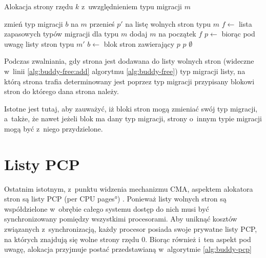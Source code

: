 \begin{algorithm}
\caption[Alokacja z~uwzględnieniem typu migracji.]{Alokacja strony
  rzędu $k$ z~uwzględnieniem typu migracji $m$}
\label{alg:buddy-fallback}
\begin{algorithmic}[1]
\State zmień typ migracji $b$ na $m$
    \State przenieś $p'$ na listę wolnych stron typu $m$
\EndFor
\EndFunction
\Statex
{}
    \State $f \gets$ lista zapasowych typów migracji dla typu $m$
    \State dodaj $m$ na początek $f$
        \State $p \gets$  biorąc pod uwagę listy stron typu $m'$
                \State $b \gets$ blok stron zawierający $p$
                \State {}
            \EndIf
            \State \Return $p$
        \EndIf
    \EndFor
    \State \Return $\emptyset$
\EndFunction
\end{algorithmic}
\end{algorithm}

Podczas zwalniania, gdy strona jest dodawana do listy wolnych stron
(wideczne w~linii \ref{alg:buddy-free:add} algorytmu
\ref{alg:buddy-free}) typ migracji listy, na którą strona trafia
determinowany jest poprzez typ migracji przypisany blokowi stron do
którego dana strona należy.

Istotne jest tutaj, aby zauważyć, iż bloki stron mogą zmieniać swój
typ migracji, a~także, że nawet jeżeli blok ma dany typ migracji,
strony o~innym typie migracji mogą być z~niego przydzielone.


\section{Listy PCP}\label{sec:pcp-lists}

Ostatnim istotnym, z~punktu widzenia mechanizmu CMA, aspektem
alokatora stron są listy PCP (\ang{per CPU pages})
\autocite[podrozdział 8.1.8]{bib:utlk}.  Ponieważ listy wolnych stron
są współdzielone w~obrębie całego systemu dostęp do nich musi być
synchronizowany pomiędzy wszystkimi procesorami.  Aby uniknąć kosztów
związanych z~synchronizacją, każdy procesor posiada swoje prywatne
listy PCP, na których znajdują się wolne strony rzędu 0.  Biorąc
również i~ten aspekt pod uwagę, alokacja przyjmuje postać
przedstawianą w~algorytmie \ref{alg:buddy-pcp}

